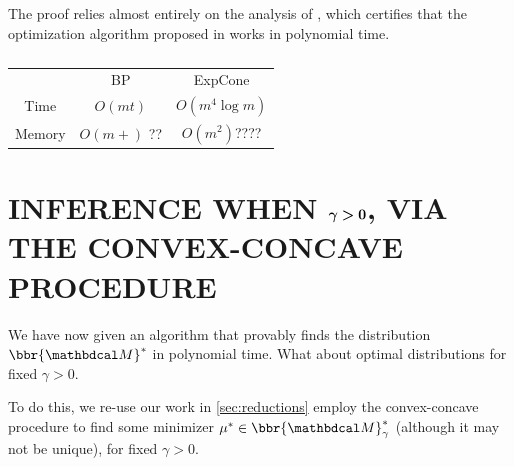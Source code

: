 \documentclass[twoside]{article}
\begin{document}
 

The proof relies almost entirely on the analysis of \textcite{badenbroek2021algorithm},
which certifies that the optimization algorithm 
proposed in \textcite{dahl2022primal} works in polynomial time. 

\begin{table}
    \centering
    \begin{tabular}{ccc}
        \toprule
        & BP &  ExpCone \\\cmidrule(lr){2-3}
        Time & $O(m t)$ & $O( m^4 \log m )$ \\
        Memory  & $O(m + )$ {\color{red}??} & $O( m^2 )${\color{red}????}\\    \bottomrule
    \end{tabular}
    
    
    \caption{ }
\end{table}

\section{INFERENCE WHEN
    \texorpdfstring{$\boldsymbol\gamma \boldsymbol> \mathbf{0}$}{gamma > 0},
    VIA THE CONVEX-CONCAVE PROCEDURE }

We have now given an algorithm that provably finds the distribution $\bbr{\dg M}^*$ in polynomial time. 
What about optimal distributions for fixed $\gamma > 0$.



To do this, we re-use our work in \cref{sec:reductions} employ the
convex-concave procedure
\parencite{yuille2003concave} to find some minimizer $\mu^* \in
\bbr{\dg M}^*_\gamma$ (although it may not be unique), for fixed
$\gamma > 0$. 
\end{document}
